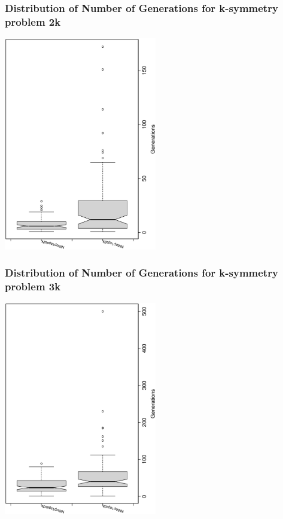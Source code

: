 \documentclass[18pt,c]{beamer}
\begin{document}
 \begin{frame}
 \frametitle{ Distribution of Number of Generations for k-symmetry problem 2k }
 \begin{center}
\includegraphics[width=0.5\textwidth, angle=-90]
{ExpDboxplottGenerations000.eps}
 \end{center}
 \label{ExpDboxplottGenerations000.eps}  
 \end{frame}

 \begin{frame}
 \frametitle{ Distribution of Number of Generations for k-symmetry problem 3k }
 \begin{center}
\includegraphics[width=0.5\textwidth, angle=-90]
{ExpDboxplottGenerations001.eps}
 \end{center}
 \label{ExpDboxplottGenerations001.eps}  
 \end{frame}
\end{document}
